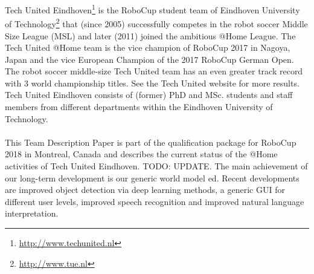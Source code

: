 Tech United Eindhoven\footnote{\url{http://www.techunited.nl}} is the RoboCup student team of Eindhoven University of Technology\footnote{\url{http://www.tue.nl}} that (since 2005) successfully competes in the robot soccer Middle Size League (MSL) and later (2011) joined the ambitious @Home League. The Tech United @Home team is the vice champion of RoboCup 2017 in Nagoya, Japan and the vice European Champion of the 2017 RoboCup German Open. The robot soccer middle-size Tech United team has an even greater track record with 3 world championship titles. See the Tech United website for more results. Tech United Eindhoven consists of (former) PhD and MSc. students and staff members from different departments within the Eindhoven University of Technology.
\\\\
This Team Description Paper is part of the qualification package for RoboCup 2018 in Montreal, Canada and describes the current status of the @Home activities of Tech United Eindhoven. TODO: UPDATE. The main achievement of our long-term development is our generic world model \acrshort{ed}. Recent developments are improved object detection via deep learning methods, a generic GUI for different user levels, improved speech recognition and improved natural language interpretation. 